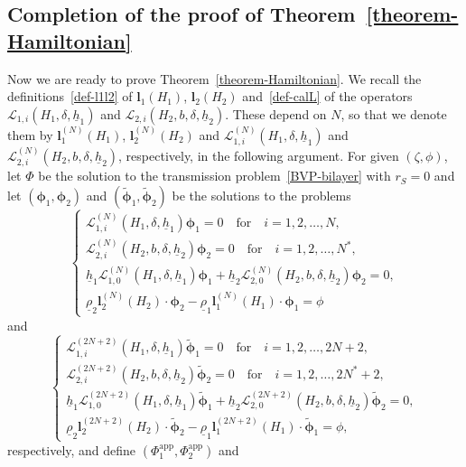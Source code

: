 \documentclass[11pt,leqno]{article}
\numberwithin{equation}{section}
\numberwithin{figure}{section}
\begin{document}
\subsection{Completion of the proof of Theorem~\ref{theorem-Hamiltonian}}
%
Now we are ready to prove Theorem~\ref{theorem-Hamiltonian}. 
We recall the definitions~\eqref{def-l1l2} of $\bm{l}_1(H_1)$, $\bm{l}_2(H_2)$ and~\eqref{def-calL} of 
the operators $\mathcal{L}_{1,i}(H_1,\delta,\underline{h}_1)$ and $\mathcal{L}_{2,i}(H_2,b,\delta,\underline{h}_2)$. 
These depend on $N$, so that we denote them by $\bm{l}_1^{(N)}(H_1)$, $\bm{l}_2^{(N)}(H_2)$ and 
$\mathcal{L}_{1,i}^{(N)}(H_1,\delta,\underline{h}_1)$ and $\mathcal{L}_{2,i}^{(N)}(H_2,b,\delta,\underline{h}_2)$, 
respectively, in the following argument. 
For given $(\zeta,\phi)$, let $\Phi$ be the solution to the transmission problem~\eqref{BVP-bilayer} with $r_S=0$ and let 
$(\bm{\phi}_1,\bm{\phi}_2)$ and $(\tilde{\bm{\phi}}_1,\tilde{\bm{\phi}}_2)$ be the solutions to the problems 
%
\[
\begin{cases}
 \mathcal{L}_{1,i}^{(N)}(H_1,\delta,\underline{h}_1)\bm{\phi}_1=0 \quad\mbox{for}\quad i=1,2,\ldots,N, \\
 \mathcal{L}_{2,i}^{(N)}(H_2,b,\delta,\underline{h}_2)\bm{\phi}_2=0 \quad\mbox{for}\quad i=1,2,\ldots,N^*, \\
 \underline{h}_1\mathcal{L}_{1,0}^{(N)}(H_1,\delta,\underline{h}_1) \bm{\phi}_1
  + \underline{h}_2\mathcal{L}_{2,0}^{(N)}(H_2,b,\delta,\underline{h}_2) \bm{\phi}_2 = 0, \\
 \underline{\rho}_2\bm{l}_2^{(N)}(H_2) \cdot \bm{\phi}_2
  - \underline{\rho}_1\bm{l}_1^{(N)}(H_1) \cdot \bm{\phi}_1 = \phi
\end{cases}
\]
%
and 
%
\[
\begin{cases}
 \mathcal{L}_{1,i}^{(2N+2)}(H_1,\delta,\underline{h}_1)\tilde{\bm{\phi}}_1=0 \quad\mbox{for}\quad i=1,2,\ldots,2N+2, \\
 \mathcal{L}_{2,i}^{(2N+2)}(H_2,b,\delta,\underline{h}_2)\tilde{\bm{\phi}}_2=0 \quad\mbox{for}\quad i=1,2,\ldots,2N^*+2, \\
 \underline{h}_1\mathcal{L}_{1,0}^{(2N+2)}(H_1,\delta,\underline{h}_1) \tilde{\bm{\phi}}_1
  + \underline{h}_2\mathcal{L}_{2,0}^{(2N+2)}(H_2,b,\delta,\underline{h}_2) \tilde{\bm{\phi}}_2 = 0, \\
 \underline{\rho}_2\bm{l}_2^{(2N+2)}(H_2) \cdot \tilde{\bm{\phi}}_2
  - \underline{\rho}_1\bm{l}_1^{(2N+2)}(H_1) \cdot \tilde{\bm{\phi}}_1 = \phi,
\end{cases}
\]
%
respectively, and define $(\Phi_1^\mathrm{app},\Phi_2^\mathrm{app})$ and 
\end{document}
